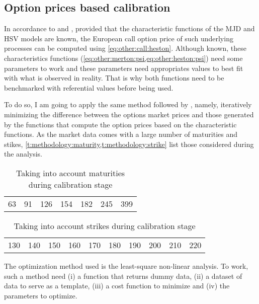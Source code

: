 \documentclass[12pt]{report}
\begin{document}
\subsection{Option prices based calibration}
\label{sub:methodology:calibration:option}

In accordance to \citet{heston1993} and \citet{criso2015}, provided that the characteristic functions of the MJD and HSV models are known, the European call option price of such underlying processes can be computed using \cref{eq:other:call:heston}.
Although known, these characteristics functions (\cref{eq:other:merton:psi,eq:other:heston:psi}) need some parameters to work and these parameters need appropriates values to best fit with what is observed in reality.
That is why both functions need to be benchmarked with referential values before being used.

To do so, I am going to apply the same method followed by \citet{criso2015}, namely, iteratively minimizing the difference between the options market prices and those generated by the functions that compute the option prices based on the characteristic functions.
As the market data comes with a large number of maturities and stikes, \cref{t:methodology:maturity,t:methodology:strike} list those considered during the analysis.

\begin{table}[ht]
\centering
\begin{tabular}{lllllll}
  63 & 91 & 126 & 154 & 182 & 245 & 399 \\
\end{tabular}
\caption{Taking into account maturities during calibration stage} 
\label{t:methodology:maturity}
\end{table}

\begin{table}[ht]
\centering
\begin{tabular}{llllllllll}
  130 & 140 & 150 & 160 & 170 & 180 & 190 & 200 & 210 & 220 \\  
\end{tabular}
\caption{Taking into account strikes during calibration stage} 
\label{t:methodology:strike}
\end{table}

The optimization method used is the least-square non-linear analysis. 
To work, such a method need (i) a function that returns dummy data, (ii) a dataset of data to serve as a template, (iii) a cost function to minimize and (iv) the parameters to optimize.
\end{document}
